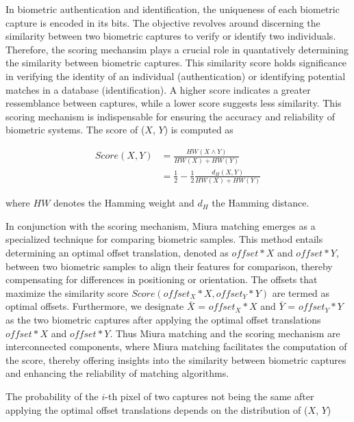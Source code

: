 In biometric authentication and identification, the uniqueness of each biometric capture is encoded in its bits. The objective revolves around discerning the similarity between two biometric captures to verify or identify two individuals. Therefore, the scoring mechansim plays a crucial role in quantatively determining the similarity between biometric captures. This similarity score holds significance in verifying the identity of an individual (authentication) or identifying potential matches in a database (identification). A higher score indicates a greater ressemblance between captures, while a lower score suggests less similarity. This scoring mechanism is indispensable for ensuring the accuracy and reliability of biometric systems. The score of (\(X\), \(Y\)) is computed as

\begin{equation} \label{eq:score}
    \begin{aligned}
        Score(X, Y) &= \frac{HW(X \land Y)}{HW(X) + HW(Y)}\\
        &= \frac{1}{2}-\frac{1}{2}\frac{d_H(X, Y)}{HW(X) + HW(Y)}
    \end{aligned}
\end{equation}

where \(HW\) denotes the Hamming weight and \(d_H\) the Hamming distance. 

In conjunction with the scoring mechanism, Miura matching emerges as a specialized technique for comparing biometric samples. This method entails determining an optimal offset translation, denoted as \(offset * X\) and \(offset * Y\), between two biometric samples to align their features for comparison, thereby compensating for differences in positioning or orientation. The offsets that maximize the similarity score \(Score(offset_X * X, offset_Y * Y)\) are termed as optimal offsets. Furthermore, we designate \(\bar{X}\) = \(offset_X * X\) and \(\bar{Y}\) = \(offset_Y * Y\) as the two biometric captures after applying the optimal offset translations \(offset * X\) and \(offset * Y\).
Thus Miura matching and the scoring mechanism are interconnected components, where Miura matching facilitates the computation of the score, thereby offering insights into the similarity between biometric captures and enhancing the reliability of matching algorithms. 

The probability of the \(i\)-th pixel of two captures not being the same after applying the optimal offset translations depends on the distribution of (\(X\), \(Y\))

